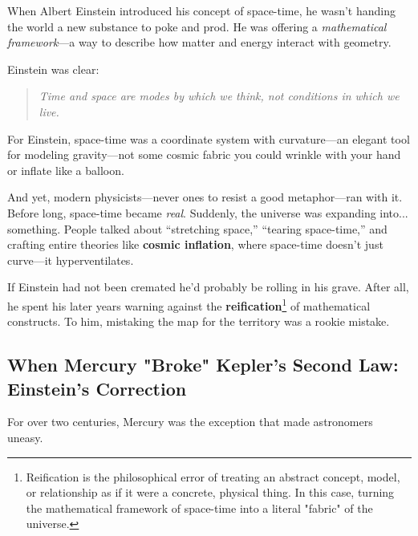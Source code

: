 \begin{tcolorbox}[colback=gray!5!white, colframe=gray!50!black, title={Historical Sidebar: Einstein’s Mathematical Warning—Ignored}]
  When Albert Einstein introduced his concept of space-time, he wasn’t handing the world a new substance to poke and prod. He was offering a \textit{mathematical framework}—a way to describe how matter and energy interact with geometry. 

  \medskip
  
  Einstein was clear:  

  \medskip

  \begin{quote}
  \textit{Time and space are modes by which we think, not conditions in which we live.}
  \end{quote}

  \medskip
  
  For Einstein, space-time was a coordinate system with curvature—an elegant tool for modeling gravity—not some cosmic fabric you could wrinkle with your hand or inflate like a balloon.

  \medskip
  
  And yet, modern physicists—never ones to resist a good metaphor—ran with it. Before long, space-time became \textit{real}. Suddenly, the universe was expanding into... something. People talked about “stretching space,” “tearing space-time,” and crafting entire theories like \textbf{cosmic inflation}, where space-time doesn’t just curve—it hyperventilates.

  \medskip
  
  If Einstein had not been cremated he'd probably be rolling in his grave. After all, he spent his later years warning against the \textbf{reification}\footnote{Reification is the philosophical error of treating an abstract concept, model, or relationship as if it were a concrete, physical thing. In this case, turning the mathematical framework of space-time into a literal "fabric" of the universe.} of mathematical constructs. To him, mistaking the map for the territory was a rookie mistake.

\end{tcolorbox}

\subsection{When Mercury "Broke" Kepler’s Second Law: Einstein’s Correction}

For over two centuries, Mercury was the exception that made astronomers uneasy.

